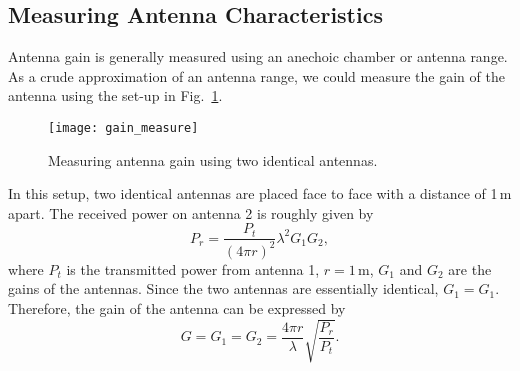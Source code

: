\documentclass[letterpaper, 11pt]{article}
\begin{document}
\subsection{Measuring Antenna Characteristics}

Antenna gain is generally measured using an anechoic chamber or antenna range. As a crude approximation of an antenna range, we could measure the gain of the antenna using the set-up in Fig.~\ref{fig:gain_measure}.
	\begin{figure}[ht]
		\centering	
		\texttt{[image: gain\_measure]}
		\caption{Measuring antenna gain using two identical antennas.}
		\label{fig:gain_measure}
	\end{figure}
	
In this setup, two identical antennas are placed face to face with a distance of 1\,m apart. The received power on antenna 2 is roughly given by 
\[
	P_r = \frac{P_t}{\left( 4\pi r \right)^2} \lambda^2 G_1 G_2,
\]
where $P_t$ is the transmitted power from antenna 1, $r = 1$\,m, $G_1$ and $G_2$ are the gains of the antennas. Since the two antennas are essentially identical, $G_1 = G_1$. Therefore, the gain of the antenna can be expressed by 
\begin{equation}
	G = G_1 = G_2 =\frac{4\pi r}{\lambda}\sqrt{\frac{P_r}{P_t}}.
	\label{eqn:gain}
\end{equation}
\end{document}
